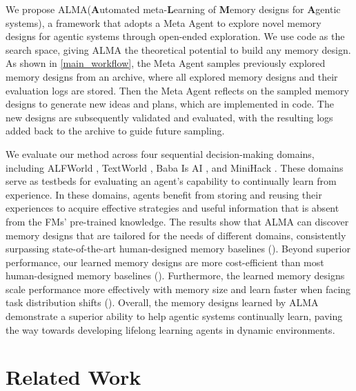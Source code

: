 \documentclass{article}
\theoremstyle{plain}
\theoremstyle{definition}
\theoremstyle{remark}
\newcommand{\ouralgo}{ALMA\xspace} %
\begin{document}
We propose \ouralgo (\textbf{A}utomated meta-\textbf{L}earning of \textbf{M}emory designs for \textbf{A}gentic systems), a framework that adopts a Meta Agent to explore novel memory designs for agentic systems through open-ended exploration. 
We use code as the search space, giving \ouralgo the theoretical potential to build any memory design.
As shown in \cref{main_workflow}, the Meta Agent samples previously explored memory designs from an archive, where all explored memory designs and their evaluation logs are stored. 
Then the Meta Agent reflects on the sampled memory designs to generate new ideas and plans, which are implemented in code.
The new designs are subsequently validated and evaluated, with the resulting logs added back to the archive to guide future sampling.

We evaluate our method across four sequential decision-making domains, including ALFWorld \citep{shridhar2021Alfworld}, TextWorld \citep{textworld}, Baba Is AI \citep{cloos2024baba}, and MiniHack \citep{samvelyan2021minihack}. These domains serve as testbeds for evaluating an agent's capability to continually learn from experience. In these domains, agents benefit from storing and reusing their experiences to acquire effective strategies and useful information that is absent from the FMs' pre-trained knowledge. The results show that \ouralgo can discover memory designs that are tailored for the needs of different domains, consistently surpassing state-of-the-art human-designed memory baselines (). Beyond superior performance, our learned memory designs are more cost-efficient than most human-designed memory baselines (). Furthermore, the learned memory designs scale performance more effectively with memory size and learn faster when facing task distribution shifts (). Overall, the memory designs learned by \ouralgo demonstrate a superior ability to help agentic systems continually learn, paving the way towards developing lifelong learning agents in dynamic environments.
\vspace{-0.6em}
\section{Related Work}
\end{document}
